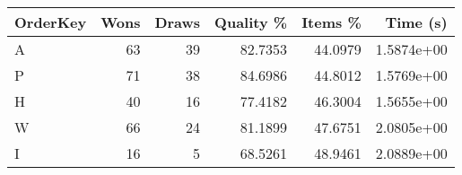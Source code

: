 \begin{tabular}{lrrrrr}
    \hline
    OrderKey & Wons & Draws & Quality \% & Items \% & Time (s)   \\
    \hline
    A        & 63   & 39    & 82.7353    & 44.0979  & 1.5874e+00 \\
    P        & 71   & 38    & 84.6986    & 44.8012  & 1.5769e+00 \\
    H        & 40   & 16    & 77.4182    & 46.3004  & 1.5655e+00 \\
    W        & 66   & 24    & 81.1899    & 47.6751  & 2.0805e+00 \\
    I        & 16   & 5     & 68.5261    & 48.9461  & 2.0889e+00 \\
    \hline
\end{tabular}